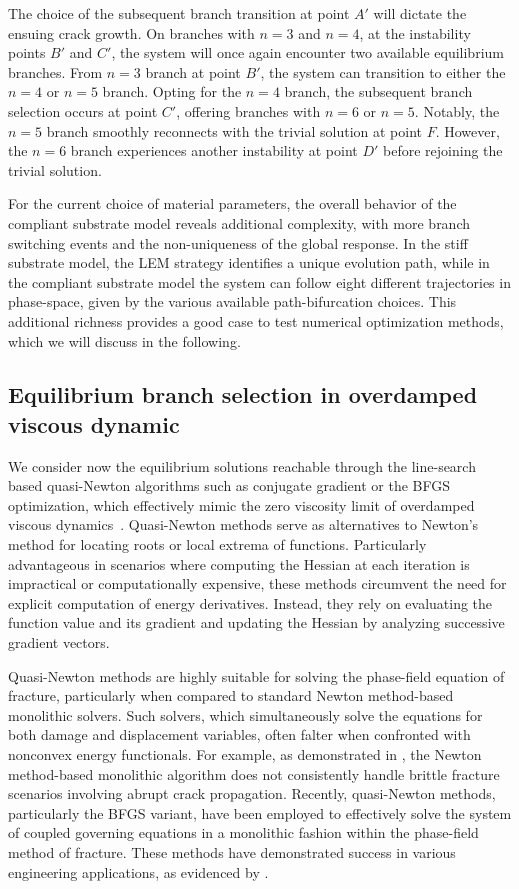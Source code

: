 \documentclass[10pt]{article}
\begin{document}
The choice of the subsequent branch transition at point $A'$ will dictate the ensuing crack growth. On branches with $n=3$ and $n=4$, at the instability points $B'$ and $C'$, the system will once again encounter two available equilibrium branches. From $n=3$ branch  at point $B'$, the system can transition to either the $n=4$ or $n=5$ branch. Opting for the $n=4$ branch, the subsequent branch selection occurs at point $C'$, offering branches with $n=6$ or $n=5$. Notably, the $n=5$ branch smoothly reconnects with the trivial solution at point $F$. However, the $n=6$ branch experiences another instability at point $D'$ before rejoining the trivial solution. 

For the current choice of material parameters, the overall behavior of the compliant substrate model reveals additional complexity, with more branch switching events and the non-uniqueness of the global response. In the stiff substrate model, the LEM strategy identifies a unique evolution path, while in the compliant substrate model the system can follow eight different trajectories in phase-space, given by the various available path-bifurcation choices. This additional richness provides a good case to test numerical optimization methods, which we will discuss in the following.

\subsection{Equilibrium branch selection in overdamped viscous dynamic}
We consider now the equilibrium solutions reachable through the line-search based quasi-Newton algorithms such as  conjugate gradient or the BFGS optimization, which effectively  mimic the zero viscosity limit of overdamped viscous dynamics~\cite{SALMAN2012219}. Quasi-Newton methods serve as alternatives to Newton's method for locating roots or local extrema of functions. Particularly advantageous in scenarios where computing the Hessian at each iteration is impractical or computationally expensive, these methods circumvent the need for explicit computation of energy derivatives. Instead, they rely on evaluating the function value and its gradient and updating the Hessian by analyzing successive gradient vectors.

Quasi-Newton methods are highly suitable for solving the phase-field equation of fracture, particularly when compared to standard Newton method-based monolithic solvers. Such solvers, which simultaneously  solve the equations for both damage and displacement variables, often falter when confronted with nonconvex energy functionals. For example, as demonstrated in \cite{Wick2017-bo}, the Newton method-based monolithic algorithm does not consistently handle brittle fracture scenarios involving abrupt crack propagation. Recently, quasi-Newton methods, particularly the BFGS variant, have been employed to effectively solve the system of coupled governing equations in a monolithic fashion within the phase-field method of fracture. These methods have demonstrated success in various engineering applications, as evidenced by \cite{Kristensen2020-zy,Wu2020-qk,Salman2021-mn,Liu2022-ix}.
\end{document}
